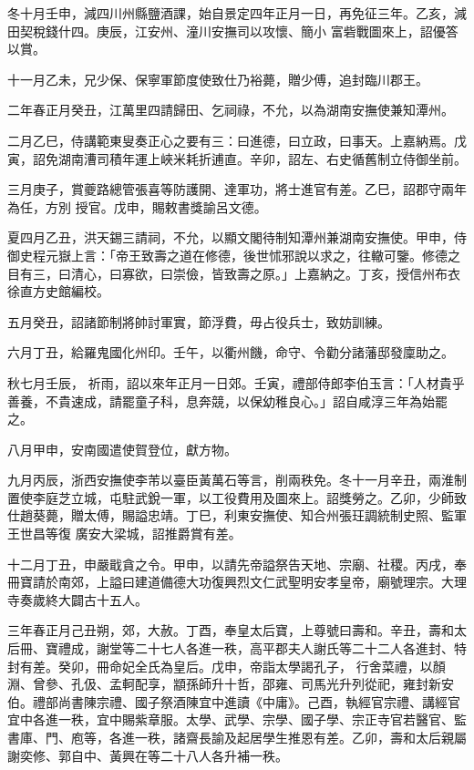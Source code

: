 \begin{pinyinscope}
 冬十月壬申，減四川州縣鹽酒課，始自景定四年正月一日，再免征三年。乙亥，減田契稅錢什四。庚辰，江安州、潼川安撫司以攻懷、簡小
 富砦戰圖來上，詔優答以賞。



 十一月乙未，兄少保、保寧軍節度使致仕乃裕薨，贈少傅，追封臨川郡王。



 二年春正月癸丑，江萬里四請歸田、乞祠祿，不允，以為湖南安撫使兼知潭州。



 二月乙巳，侍講範東叟奏正心之要有三：曰進德，曰立政，曰事天。上嘉納焉。戊寅，詔免湖南漕司積年運上峽米耗折逋直。辛卯，詔左、右史循舊制立侍御坐前。



 三月庚子，賞夔路總管張喜等防護開、達軍功，將士進官有差。乙巳，詔郡守兩年為任，方別
 授官。戊申，賜敕書獎諭呂文德。



 夏四月乙丑，洪天錫三請祠，不允，以顯文閣待制知潭州兼湖南安撫使。甲申，侍御史程元嶽上言：「帝王致壽之道在修德，後世怵邪說以求之，往轍可鑒。修德之目有三，曰清心，曰寡欲，曰崇儉，皆致壽之原。」上嘉納之。丁亥，授信州布衣徐直方史館編校。



 五月癸丑，詔諸節制將帥討軍實，節浮費，毋占役兵士，致妨訓練。



 六月丁丑，給羅鬼國化州印。壬午，以衢州饑，命守、令勸分諸藩邸發廩助之。



 秋七月壬辰，
 祈雨，詔以來年正月一日郊。壬寅，禮部侍郎李伯玉言：「人材貴乎善養，不貴速成，請罷童子科，息奔競，以保幼稚良心。」詔自咸淳三年為始罷之。



 八月甲申，安南國遣使賀登位，獻方物。



 九月丙辰，浙西安撫使李芾以臺臣黃萬石等言，削兩秩免。冬十一月辛丑，兩淮制置使李庭芝立城，屯駐武銳一軍，以工役費用及圖來上。詔獎勞之。乙卯，少師致仕趙葵薨，贈太傅，賜謚忠靖。丁巳，利東安撫使、知合州張玨調統制史照、監軍王世昌等復
 廣安大梁城，詔推爵賞有差。



 十二月丁丑，申嚴戢貪之令。甲申，以請先帝謚祭告天地、宗廟、社稷。丙戌，奉冊寶請於南郊，上謚曰建道備德大功復興烈文仁武聖明安孝皇帝，廟號理宗。大理寺奏歲終大闢古十五人。



 三年春正月己丑朔，郊，大赦。丁酉，奉皇太后寶，上尊號曰壽和。辛丑，壽和太后冊、寶禮成，謝堂等二十七人各進一秩，高平郡夫人謝氏等二十二人各進封、特封有差。癸卯，冊命妃全氏為皇后。戊申，帝詣太學謁孔子，
 行舍菜禮，以顏淵、曾參、孔伋、孟軻配享，顓孫師升十哲，邵雍、司馬光升列從祀，雍封新安伯。禮部尚書陳宗禮、國子祭酒陳宜中進讀《中庸》。己酉，執經官宗禮、講經官宜中各進一秩，宜中賜紫章服。太學、武學、宗學、國子學、宗正寺官若醫官、監書庫、門、庖等，各進一秩，諸齋長諭及起居學生推恩有差。乙卯，壽和太后親屬謝奕修、郭自中、黃興在等二十八人各升補一秩。




\end{pinyinscope}
